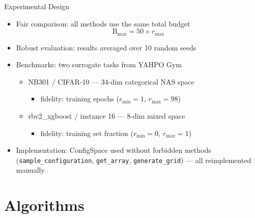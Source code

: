 \documentclass[t,english]{beamer}
\begin{document}
\begin{frame}{Experimental Design}
  \begin{itemize}[<+->]
    \item Fair comparison: all methods use the same total budget 
          \[
          \text{B}_{\max} = 50 \times r_{\max}
          \]
    \item Robust evaluation: results averaged over 10 random seeds
    \item Benchmarks: two surrogate tasks from YAHPO Gym
      \begin{itemize}[<+->]
        \item NB301 / CIFAR-10 — 34-dim categorical NAS space
          \begin{itemize}
            \item fidelity: training epochs ($r_{\min}=1$, $r_{\max}=98$)
          \end{itemize}
        \item rbv2\_xgboost / instance 16 — 8-dim mixed space
          \begin{itemize}
            \item fidelity: training set fraction ($r_{\min}=0$, $r_{\max}=1$)
          \end{itemize}
      \end{itemize}
    \item Implementation: ConfigSpace used without forbidden methods
          (\texttt{sample\_configuration}, \texttt{get\_array},
           \texttt{generate\_grid}) — all reimplemented manually
  \end{itemize}
\end{frame}

\section{Algorithms}
\end{document}

